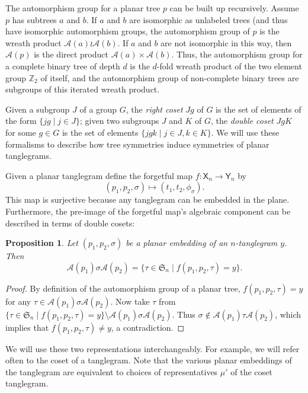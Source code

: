 \documentclass{amsart}
\newtheorem{proposition}{Proposition}
\newcommand{\ZZ}{\mathbb Z}
\newcommand{\fS}{\mathfrak S}
\newcommand{\aut}{\mathcal A}
\newcommand{\pairing}{\mu}
\newcommand{\ptangle}{\mathsf{X}}
\newcommand{\tangle}{\mathsf{Y}}
\begin{document}
The automorphism group for a planar tree $p$ can be built up recursively.
Assume $p$ has subtrees $a$ and $b$.
If $a$ and $b$ are isomorphic as unlabeled trees (and thus have isomorphic automorphism groups, the automorphism group of $p$ is the wreath product $\aut(a) \wr \aut(b)$.
If $a$ and $b$ are not isomorphic in this way, then $\aut(p)$ is the direct product $\aut(a) \times \aut(b)$.
Thus, the automorphism group for a complete binary tree of depth $d$ is the $d$-fold wreath product of the two element group $\ZZ_2$ of itself, and the automorphism group of non-complete binary trees are subgroups of this iterated wreath product.

Given a subgroup $J$ of a group $G$, the \emph{right coset} $Jg$ of $G$ is the set of elements of the form $\{jg \mid j \in J\}$;
given two subgroups $J$ and $K$ of $G$, the \emph{double coset} $JgK$ for some $g \in G$ is the set of elements $\{jgk \mid j \in J, k \in K\}$.
We will use these formalisms to describe how tree symmetries induce symmetries of planar tanglegrams.

Given a planar tanglegram define the forgetful map $f: \ptangle_n \rightarrow \tangle_n$ by
\begin{equation}
\label{eq:forgetful}
(p_1, p_2, \sigma) \mapsto (t_1, t_2, \phi_\sigma).
\end{equation}
This map is surjective because any tanglegram can be embedded in the plane.
Furthermore, the pre-image of the forgetful map's algebraic component can be described in terms of double cosets:
\begin{proposition}
\label{prop:doubleCosets}
Let $(p_1, p_2, \sigma)$ be a planar embedding of an $n$-tanglegram $y$. Then
\[
\aut(p_1) \sigma \aut(p_2) = \{\tau \in \fS_n \mid f(p_1, p_2, \tau) = y\}.
\]
\end{proposition}
\begin{proof}
By definition of the automorphism group of a planar tree, $f(p_1, p_2, \tau) = y$ for any $\tau \in \aut(p_1) \sigma \aut(p_2)$.
Now take $\tau$ from $\{\tau \in \fS_n \mid f(p_1, p_2, \tau) = y\} \setminus \aut(p_1) \sigma \aut(p_2)$.
Thus $\sigma \not \in \aut(p_1) \tau \aut(p_2)$, which implies that $f(p_1, p_2, \tau) \neq y$, a contradiction.
\end{proof}

We will use these two representations interchangeably.
For example, we will refer often to the coset of a tanglegram.
Note that the various planar embeddings of the tanglegram are equivalent to choices of representatives $\pairing'$ of the coset tanglegram.
\end{document}

